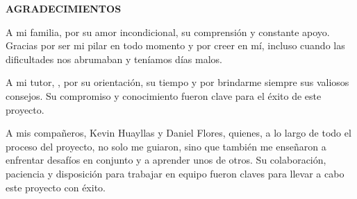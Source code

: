\cleardoublepage
\thispagestyle{plain} %

\begin{center}
    {\Large \bfseries AGRADECIMIENTOS}
\end{center}

\vspace{1cm}

\noindent A mi familia, por su amor incondicional, su comprensión y constante apoyo. Gracias por ser
mi pilar en todo momento y por creer en mí, incluso cuando las dificultades nos abrumaban
y teníamos días malos.
\vspace{0.3cm}

\noindent A mi tutor, {\tutorTesis}, por su orientación, su tiempo y por brindarme siempre sus 
valiosos consejos. Su compromiso y conocimiento fueron clave para el éxito de este proyecto.

\vspace{0.3cm}

\noindent A mis compañeros, Kevin Huayllas y Daniel Flores, quienes, a lo largo de todo el proceso
del proyecto, no solo me guiaron, sino que también me enseñaron a enfrentar desafíos en
conjunto y a aprender unos de otros. Su colaboración, paciencia y disposición para trabajar
en equipo fueron claves para llevar a cabo este proyecto con éxito.

\vfill